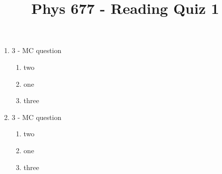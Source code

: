\documentclass[letterpaper,10pt]{article}
\title{Phys 677 - Reading Quiz 1}
\begin{document}
\maketitle

\begin{enumerate}
    \item 3 - MC question
    \begin{enumerate}
        \item two
        \item one
        \item three
    \end{enumerate}
    \item 3 - MC question
    \begin{enumerate}
        \item two
        \item one
        \item three
    \end{enumerate}
\end{enumerate}
\end{document}
